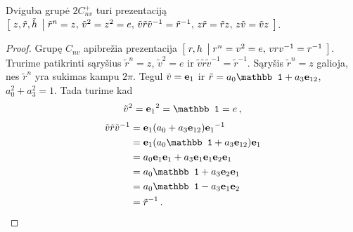 \begin{proposition}
	Dviguba grupė $2C_{nv}^+$ turi prezentaciją
	$\left[\; z,\tilde r,\tilde h \;\left|\; 
		\tilde r^n=z,\,
		\tilde v^2=z^2=e,\,
		\tilde v\tilde r\tilde v^{-1}=\tilde r^{-1},\,
		z\tilde r=\tilde rz,\,
		z\tilde v=\tilde vz
	 \;\right.\right]$.
\end{proposition}
\begin{proof}
	Grupę $C_{nv}$ apibrežia prezentacija $\left[\; r,h \;\left|\; r^n=v^2=e,\, vrv^{-1}=r^{-1} \;\right.\right]$.
	Trurime patikrinti sąryšius $\tilde r^n=z$, $\tilde v^2=e$ ir $\tilde v\tilde r\tilde v^{-1}=\tilde r^{-1}$.
	Sąryšis $\tilde r^n=z$ galioja, nes $\tilde r^n$ yra sukimas kampu $2\pi$.
	Tegul $\tilde v = \vb e_1$ ir $\tilde r = a_0 \mathbb1 + a_3 \vb e_{12}$, $a_0^2+a_3^2=1$.
	Tada turime kad
	\begin{equation}
		\tilde v^2 = {\vb e_1}^2 = \mathbb1 = e 
		\,,
	\end{equation}
	\begin{equation}
		\begin{aligned}
			\tilde v\tilde r\tilde v^{-1}
			&=\vb e_1 (a_0 + a_3 \vb e_{12}) {\vb e_1}^{-1}
			\\&=\vb e_1 (a_0 \mathbb1 + a_3 \vb e_{12}) {\vb e_1}
			\\&=a_0 \vb e_1 \vb e_1 + a_3 \vb e_1 \vb e_1 \vb e_2 \vb e_1 
			\\&=a_0 \mathbb1 + a_3 \vb e_2 \vb e_1 
			\\&=a_0 \mathbb1 - a_3 \vb e_1 \vb e_2 
			\\&=\tilde r^{-1}
			\,.
		\end{aligned}
	\end{equation}
\end{proof}


